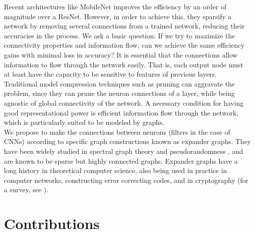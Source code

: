 \noindent Recent architectures like MobileNet\cite{howard2017mobilenets} improves the efficiency by an order of magnitude over a ResNet. However, in order to achieve this, they sparsify a network by removing several connections from a trained network, reducing their accuracies in the process. We ask a basic question: If we try to maximize the connectivity properties and information flow, can we achieve the same efficiency gains with minimal loss in accuracy? It is essential that the connections allow information to flow through the network easily. That is, each output node must at least have the capacity to be sensitive to features of previous layers. Traditional model compression techniques such as pruning can aggravate the problem, since they can prune the neuron connections of a layer, while being agnostic of global connectivity of the network. A necessary condition for having good representational power is efficient information flow through the network, which is particularly suited to be modeled by graphs. \\

\noindent We propose to make the connections between neurons (filters in the case of CNNs) according to specific graph constructions known as expander graphs. They have been widely studied in spectral graph theory \cite{spielman2007spectral} and pseudorandomness \cite{salil2012pseudo}, and are known to be sparse but highly connected graphs. Expander graphs have a long history in theoretical computer science, also being used in practice in computer networks, constructing error correcting codes, and in cryptography (for a survey, see \cite{hoory2006expander}). 

\section{Contributions}

